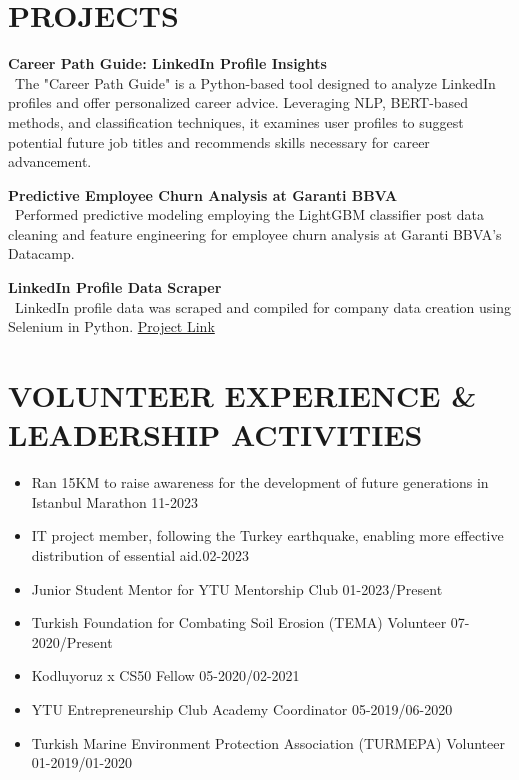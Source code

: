 \documentclass[a4paper,9pt]{extarticle}
\begin{document}
\section*{PROJECTS}
\noindent
\textbf{Career Path Guide: LinkedIn Profile Insights} \\
\ The "Career Path Guide" is a Python-based tool designed to analyze LinkedIn profiles and offer personalized career advice. Leveraging NLP, BERT-based methods, and classification techniques, it examines user profiles to suggest potential future job titles and recommends skills necessary for career advancement.

\noindent
\textbf{Predictive Employee Churn Analysis at Garanti BBVA} \\
\ Performed predictive modeling employing the LightGBM classifier post data cleaning and feature engineering for employee churn analysis at Garanti BBVA's Datacamp.

\noindent
\textbf{LinkedIn Profile Data Scraper} \\
\ LinkedIn profile data was scraped and compiled for company data creation using Selenium in Python.
\href{https://github.com/eslemguler/Linkedin-Profile-Scraper}{Project Link}

\section*{VOLUNTEER EXPERIENCE \& LEADERSHIP ACTIVITIES}
\begin{itemize}
    \item Ran 15KM to raise awareness for the development of future generations in Istanbul Marathon \hfill 11-2023
    \item IT project member, following the Turkey earthquake, enabling more effective distribution of essential aid.\hfill 02-2023
    \item Junior Student Mentor for YTU Mentorship Club \hfill 01-2023/Present
    \item Turkish Foundation for Combating Soil Erosion (TEMA) Volunteer \hfill 07-2020/Present
    \item Kodluyoruz x CS50 Fellow \hfill 05-2020/02-2021
    \item YTU Entrepreneurship Club Academy Coordinator \hfill 05-2019/06-2020
    \item Turkish Marine Environment Protection Association (TURMEPA) Volunteer \hfill 01-2019/01-2020
\end{itemize}


\end{document}

